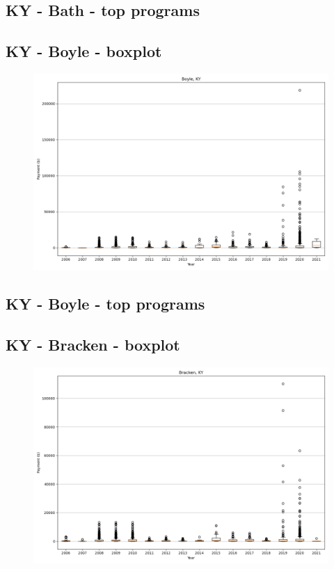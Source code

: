 \subsection*{KY - Bath - top programs}

\newpage
\subsection*{KY - Boyle - boxplot}
\begin{figure}[h]
\centering
\includegraphics[width=7in]{../output/boxplots/counties/Boyle-KY_boxplot.png}
\end{figure}


\subsection*{KY - Boyle - top programs}

\newpage
\subsection*{KY - Bracken - boxplot}
\begin{figure}[h]
\centering
\includegraphics[width=7in]{../output/boxplots/counties/Bracken-KY_boxplot.png}
\end{figure}


